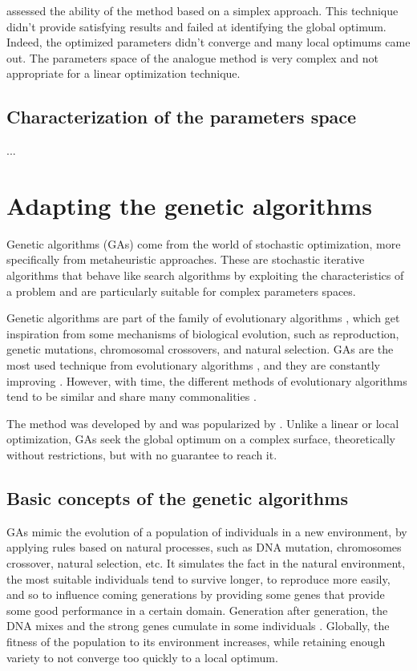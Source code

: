 \documentclass[twocol]{ametsoc}
\begin{document}
\citet{Horton2012a} assessed the ability of the \citep{Nelder1965a} method based on a simplex approach. This technique didn't provide satisfying results and failed at identifying the global optimum. Indeed, the optimized parameters didn't converge and many local optimums came out. The parameters space of the analogue method is very complex and not appropriate for a linear optimization technique. 


\subsection{Characterization of the parameters space}
...


\section{Adapting the genetic algorithms}

Genetic algorithms (GAs) come from the world of stochastic optimization, more specifically from metaheuristic approaches. These are stochastic iterative algorithms that behave like search algorithms by exploiting the characteristics of a problem and are particularly suitable for complex parameters spaces.

Genetic algorithms are part of the family of evolutionary algorithms \citet{Back1993c, Schwefel1993}, which get inspiration from some mechanisms of biological evolution, such as reproduction, genetic mutations, chromosomal crossovers, and natural selection. GAs are the most used technique from evolutionary algorithms \citep{Back1993b}, and they are constantly improving \citep{Haupt2004}. However, with time, the different methods of evolutionary algorithms tend to be similar and share many commonalities \citep{Back1996b, Haupt2004}.

The method was developed by \citet{Holland1992b} and was popularized by \citet{Goldberg1989}. Unlike a linear or local optimization, GAs seek the global optimum on a complex surface, theoretically without restrictions, but with no guarantee to reach it.


\subsection{Basic concepts of the genetic algorithms}

GAs mimic the evolution of a population of individuals in a new environment, by applying rules based on natural processes, such as DNA mutation, chromosomes crossover, natural selection, etc. It simulates the fact in the natural environment, the most suitable individuals tend to survive longer, to reproduce more easily, and so to influence coming generations by providing some genes that provide some good performance in a certain domain. Generation after generation, the DNA mixes and the strong genes cumulate in some individuals \citep{Beasley1996a}. Globally, the fitness of the population to its environment increases, while retaining enough variety to not converge too quickly to a local optimum.
\end{document}
